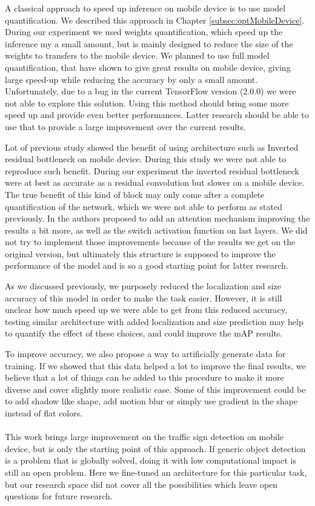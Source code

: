 A classical approach to speed up inference on mobile device is to use model quantification. We described this approach in Chapter \ref{subsec:optMobileDevice}. During our experiment we used weights quantification, which speed up the inference my a small amount, but is mainly designed to reduce the size of the weights to transfers to the mobile device. We planned to use full model quantification, that have shown to give great results on mobile device, giving large speed-up while reducing the accuracy by only a small amount. Unfortunately, due to a bug in the current TensorFlow version (2.0.0) we were not able to explore this solution. Using this method should bring some more speed up and provide even better performances. Latter research should be able to use that to provide a large improvement over the current results.

Lot of previous study \cite{sandler2018mobilenetv2, howard2019mobilenetv3} showed the benefit of using architecture such as Inverted residual bottleneck on mobile device. During this study we were not able to reproduce such benefit. During our experiment the inverted residual bottleneck were at best as accurate as a residual convolution but slower on a mobile device. The true benefit of this kind of block may only come after a complete quantification of the network, which we were not able to perform as stated previously. In \cite{howard2019mobilenetv3} the authors proposed to add an attention mechanism improving the results a bit more, as well as the switch activation function on last layers. We did not try to implement those improvements because of the results we get on the original version, but ultimately this structure is supposed to improve the performance of the model and is so a good starting point for latter research.

As we discussed previously, we purposely reduced the localization and size accuracy of this model in order to make the task easier. However, it is still unclear how much speed up we were able to get from this reduced accuracy, testing similar architecture with added localization and size prediction may help to quantify the effect of these choices, and could improve the mAP results.

To improve accuracy, we also propose a way to artificially generate data for training. If we showed that this data helped a lot to improve the final results, we believe that a lot of things can be added to this procedure to make it more diverse and cover slightly more realistic case. Some of this improvement could be to add shadow like shape, add motion blur or simply use gradient in the shape instead of flat colors.

\paragraph{}
This work brings large improvement on the traffic sign detection on mobile device, but is only the starting point of this approach. If generic object detection is a problem that is globally solved, doing it with low computational impact is still an open problem. Here we fine-tuned an architecture for this particular task, but our research space did not cover all the possibilities which leave open questions for future research.


